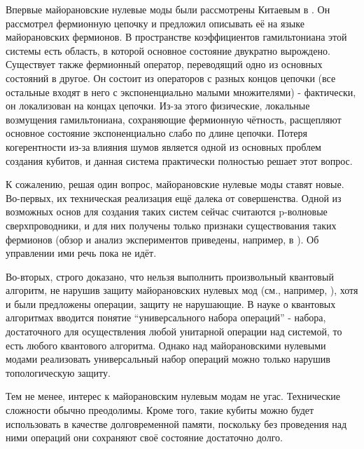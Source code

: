\documentclass[a4paper,12pt]{article}
\theoremstyle{plain} %
\theoremstyle{definition} %
\theoremstyle{remark} %
\begin{document}
Впервые майорановские нулевые моды были рассмотрены Китаевым в \cite{kitaev}. Он рассмотрел фермионную цепочку и предложил описывать её на языке майорановских фермионов. В пространстве коэффициентов гамильтониана этой системы есть область, в которой основное состояние двукратно вырождено. Существует также фермионный оператор, переводящий одно из основных состояний в другое. Он состоит из операторов с разных концов цепочки (все остальные входят в него с экспоненциально малыми множителями) - фактически, он локализован на концах цепочки. Из-за этого физические, локальные возмущения гамильтониана, сохраняющие фермионную чётность, расщепляют основное состояние экспоненциально слабо по длине цепочки. Потеря когерентности из-за влияния шумов является одной из основных проблем создания кубитов, и данная система практически полностью решает этот вопрос.

К сожалению, решая один вопрос, майорановские нулевые моды ставят новые. Во-первых, их техническая реализация ещё далека от совершенства. Одной из возможных основ для создания таких систем сейчас считаются p-волновые сверхпроводники, и для них получены только признаки существования таких фермионов (обзор и анализ экспериментов приведены, например, в \cite{computation}). Об управлении ими речь пока не идёт.

Во-вторых, строго доказано, что нельзя выполнить произвольный квантовый алгоритм, не нарушив защиту майорановских нулевых мод (см., например, \cite{anyons}), хотя и были предложены операции, защиту не нарушающие. В науке о квантовых алгоритмах вводится понятие ``универсального набора операций'' - набора, достаточного для осуществления любой унитарной операции над системой, то есть любого квантового алгоритма. Однако над майорановскими нулевыми модами реализовать универсальный набор операций можно только нарушив топологическую защиту.

Тем не менее, интерес к майорановским нулевым модам не угас. Технические сложности обычно преодолимы. Кроме того, такие кубиты можно будет использовать в качестве долговременной памяти, поскольку без проведения над ними операций они сохраняют своё состояние достаточно долго.
\end{document}
